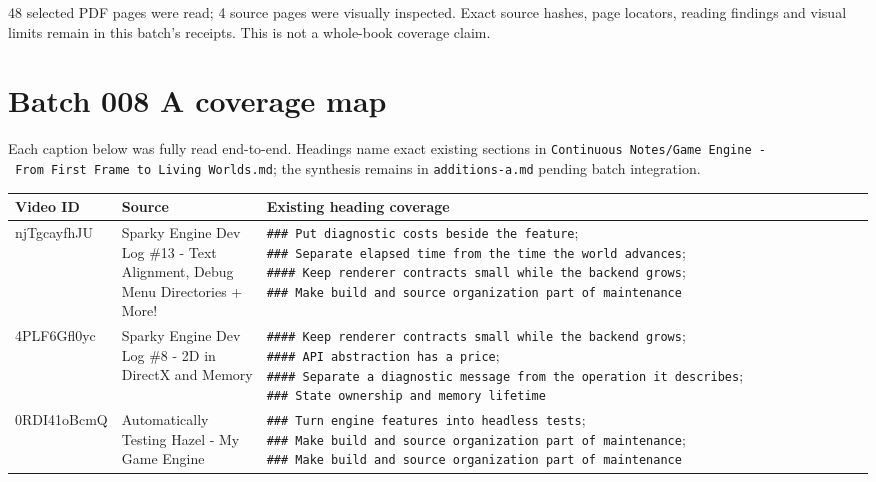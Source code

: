 48 selected PDF pages were read; 4 source pages were visually inspected. Exact source hashes, page locators, reading findings and visual limits remain in this batch's receipts. This is not a whole-book coverage claim.

\section{Batch 008 A coverage map}\label{batch-008-a-coverage-map}

Each caption below was fully read end-to-end. Headings name exact existing sections in \texttt{Continuous\ Notes/Game\ Engine\ -\ From\ First\ Frame\ to\ Living\ Worlds.md}; the synthesis remains in \texttt{additions-a.md} pending batch integration.

{\def\LTcaptype{none} %
\begin{longtable}[]{@{}
  >{\raggedright\arraybackslash}p{}
  >{\raggedright\arraybackslash}p{}
  >{\raggedright\arraybackslash}p{}@{}}
\toprule\noalign{}
\begin{minipage}[b]{\linewidth}\raggedright
Video ID
\end{minipage} & \begin{minipage}[b]{\linewidth}\raggedright
Source
\end{minipage} & \begin{minipage}[b]{\linewidth}\raggedright
Existing heading coverage
\end{minipage} \\
\midrule\noalign{}
\endhead
\bottomrule\noalign{}
\endlastfoot
njTgcayfhJU & Sparky Engine Dev Log \#13 - Text Alignment, Debug Menu Directories + More! & \texttt{\#\#\#\ Put\ diagnostic\ costs\ beside\ the\ feature}; \texttt{\#\#\#\ Separate\ elapsed\ time\ from\ the\ time\ the\ world\ advances}; \texttt{\#\#\#\#\ Keep\ renderer\ contracts\ small\ while\ the\ backend\ grows}; \texttt{\#\#\#\ Make\ build\ and\ source\ organization\ part\ of\ maintenance} \\
4PLF6Gfl0yc & Sparky Engine Dev Log \#8 - 2D in DirectX and Memory & \texttt{\#\#\#\#\ Keep\ renderer\ contracts\ small\ while\ the\ backend\ grows}; \texttt{\#\#\#\#\ API\ abstraction\ has\ a\ price}; \texttt{\#\#\#\#\ Separate\ a\ diagnostic\ message\ from\ the\ operation\ it\ describes}; \texttt{\#\#\#\ State\ ownership\ and\ memory\ lifetime} \\
0RDI41oBcmQ & Automatically Testing Hazel - My Game Engine & \texttt{\#\#\#\ Turn\ engine\ features\ into\ headless\ tests}; \texttt{\#\#\#\ Make\ build\ and\ source\ organization\ part\ of\ maintenance}; \texttt{\#\#\#\ Make\ build\ and\ source\ organization\ part\ of\ maintenance} \\

\end{longtable}}

